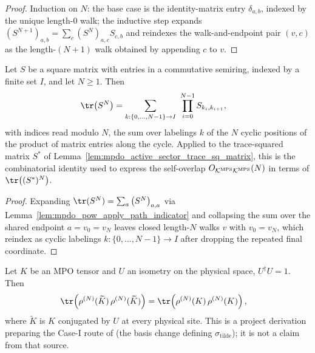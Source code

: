 \begin{proof}
    \leanok
    Induction on $N$: the base case is the identity-matrix entry
    $\delta_{a,b}$, indexed by the unique length-$0$ walk; the
    inductive step expands $\left(S^{N+1}\right)_{a,b}
        =\sum_c\left(S^N\right)_{a,c}S_{c,b}$ and reindexes the
    walk-and-endpoint pair $(v,c)$ as the length-$(N+1)$ walk obtained
    by appending $c$ to $v$.
\end{proof}

\begin{lemma}
    \label{thm:mpdo_trace_pow_cyclic_product}
    \leanok
    Let $S$ be a square matrix with entries in a commutative semiring,
    indexed by a finite set $I$, and let $N\geq1$. Then
    \begin{align}
        \tr\!\left(S^N\right)
         & =\sum_{k:\{0,\ldots,N-1\}\to I}
        \ \prod_{i=0}^{N-1}S_{k_i,k_{i+1}},
        \notag
    \end{align}
    with indices read modulo $N$, the sum over labelings $k$ of the
    $N$ cyclic positions of the product of matrix entries along the
    cycle. Applied to the trace-squared matrix $S^*$ of
    Lemma~\ref{lem:mpdo_active_sector_trace_sq_matrix}, this is the
    combinatorial identity used to express the self-overlap
    $O_{{\cal K}^{\mathrm{MPS}}{\cal K}^{\mathrm{MPS}}}(N)$ in terms of
    $\tr\!\left((S^*)^N\right)$.
\end{lemma}

\begin{proof}
    \leanok
    Expanding $\tr(S^N)=\sum_a\left(S^N\right)_{a,a}$ via
    Lemma~\ref{lem:mpdo_pow_apply_path_indicator} and collapsing the sum
    over the shared endpoint $a=v_0=v_N$ leaves closed length-$N$ walks
    $v$ with $v_0=v_N$, which reindex as cyclic labelings
    $k:\{0,\ldots,N-1\}\to I$ after dropping the repeated final
    coordinate.
\end{proof}

\begin{lemma}
    \label{lem:mpdo_trace_conjugate_physical_invariant}
    \leanok
    Let $K$ be an MPO tensor and $U$ an isometry on the physical space,
    $U^\dagger U=1$. Then
    \begin{align}
        \tr\!\left(\rho^{(N)}(\widetilde K)\,\rho^{(N)}(\widetilde K)\right)
         & =\tr\!\left(\rho^{(N)}(K)\,\rho^{(N)}(K)\right),
        \notag
    \end{align}
    where $\widetilde K$ is $K$ conjugated by $U$ at every physical site.
    This is a project derivation preparing the Case-I route of
    \cite[Appendix~C.2, lines~1434--1448]{Cirac2016MPDO_arXiv} (the basis
    change defining $\sigma_{\mathrm{tilde}}$); it is not a claim from that
    source.
\end{lemma}

